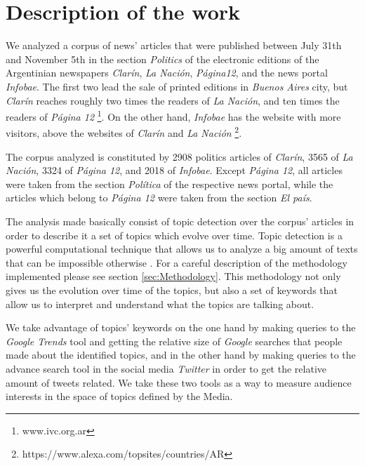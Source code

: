 
\section{Description of the work}
\label{sec:description}

\par We analyzed a corpus of news' articles that were published between July 31th and November 5th in the section \emph{Politics} of the electronic editions of the Argentinian newspapers \emph{Clarín}, \emph{La Nación}, \emph{Página12}, and the news portal \emph{Infobae}.
The first two lead the sale of printed editions in \emph{Buenos Aires} city, but \emph{Clarín} reaches roughly two times the readers of \emph{La Nación}, and ten times the readers of \emph{Página 12} \footnote{www.ivc.org.ar}. On the other hand, \emph{Infobae} has the website with more visitors, above the websites of \emph{Clarín} and \emph{La Nación} \footnote{https://www.alexa.com/topsites/countries/AR}.

\par The corpus analyzed is constituted by 2908 politics articles of \emph{Clarín}, 3565 of \emph{La Nación}, 3324 of \emph{Página 12}, and 2018 of \emph{Infobae}. Except \emph{Página 12}, all articles were taken from the section \emph{Política} of the respective news portal, while the articles which belong to \emph{Página 12} were taken from the section \emph{El país}.

\par The analysis made basically consist of topic detection over the corpus' articles in order to describe it a set of topics which evolve over time. Topic detection is a powerful computational technique that allows us to analyze a big amount of texts that can be impossible otherwise \cite{griffiths2004finding}. For a careful description of the methodology implemented please see section \ref{sec:Methodology}. 
This methodology not only gives us the evolution over time of the topics, but also a set of keywords that allow us to interpret and understand what the topics are talking about. 
\par We take advantage of topics' keywords on the one hand by making queries to the \emph{Google Trends} tool and getting the relative size of \emph{Google} searches that people made about the identified topics, and in the other hand by making queries to the advance search tool in the social media \emph{Twitter} in order to get the relative amount of tweets related. 
We take these two tools as a way to measure audience interests in the space of topics defined by the Media.

